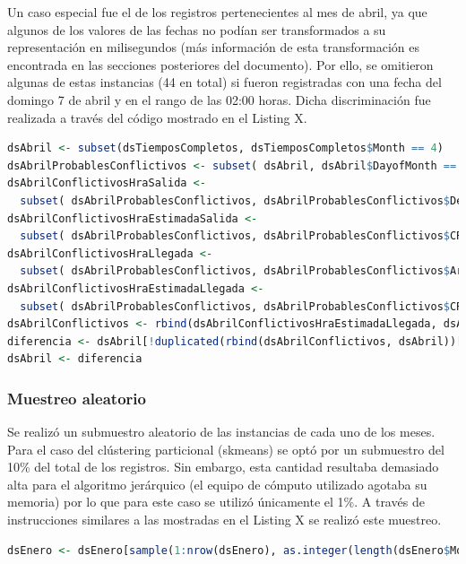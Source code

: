 \documentclass[12pt]{article}
\numberwithin{equation}{section}
\numberwithin{table}{section}
\numberwithin{figure}{section}
\begin{document}
Un caso especial fue el de los registros pertenecientes al mes de abril, ya que algunos de los valores de las fechas no podían ser transformados a su representación en milisegundos (más información de esta transformación es encontrada en las secciones posteriores del documento).
Por ello, se omitieron algunas de estas instancias (44 en total) si fueron registradas con una fecha del domingo 7 de abril y en el rango de las 02:00 horas. Dicha discriminación fue realizada a través del código mostrado en el Listing X.
\begin{lstlisting}[language=R, caption=Separación de registros del mes de abril]
dsAbril <- subset(dsTiemposCompletos, dsTiemposCompletos$Month == 4)
dsAbrilProbablesConflictivos <- subset( dsAbril, dsAbril$DayofMonth == 7)
dsAbrilConflictivosHraSalida <- 
  subset( dsAbrilProbablesConflictivos, dsAbrilProbablesConflictivos$DepTime >= 200 & dsAbrilProbablesConflictivos$DepTime < 300)
dsAbrilConflictivosHraEstimadaSalida <- 
  subset( dsAbrilProbablesConflictivos, dsAbrilProbablesConflictivos$CRSDepTime >= 200 & dsAbrilProbablesConflictivos$CRSDepTime < 300)
dsAbrilConflictivosHraLlegada <- 
  subset( dsAbrilProbablesConflictivos, dsAbrilProbablesConflictivos$ArrTime >= 200 & dsAbrilProbablesConflictivos$ArrTime < 300)
dsAbrilConflictivosHraEstimadaLlegada <- 
  subset( dsAbrilProbablesConflictivos, dsAbrilProbablesConflictivos$CRSArrTime >= 200 & dsAbrilProbablesConflictivos$CRSArrTime < 300)
dsAbrilConflictivos <- rbind(dsAbrilConflictivosHraEstimadaLlegada, dsAbrilConflictivosHraEstimadaSalida, dsAbrilConflictivosHraSalida, dsAbrilConflictivosHraLlegada)
diferencia <- dsAbril[!duplicated(rbind(dsAbrilConflictivos, dsAbril))[-seq_len(nrow(dsAbrilConflictivos))], ]
dsAbril <- diferencia
\end{lstlisting}

\subsubsection{Muestreo aleatorio}
Se realizó un submuestro aleatorio de las instancias de cada uno de los meses. Para el caso del clústering particional (skmeans) se optó por un submuestro del 10\% del total de los registros.
Sin embargo, esta cantidad resultaba demasiado alta para el algoritmo jerárquico (el equipo de cómputo utilizado agotaba su memoria) por lo que para este caso se utilizó únicamente el 1\%.
A través de instrucciones similares a las mostradas en el Listing X se realizó este muestreo.

\begin{lstlisting}[language=R, caption=Muestreo aleatorio de registros por mes]
dsEnero <- dsEnero[sample(1:nrow(dsEnero), as.integer(length(dsEnero$Month) * tamanyoMuestra), replace=FALSE),]
\end{lstlisting}
\end{document}
